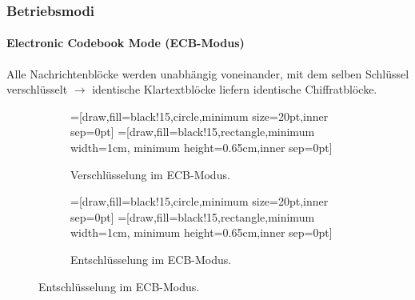 \subsubsection{Betriebsmodi}

\paragraph{Electronic Codebook Mode (ECB-Modus)}
Alle Nachrichtenblöcke werden unabhängig voneinander, mit dem selben Schlüssel verschlüsselt \(\rightarrow\) identische Klartextblöcke liefern identische Chiffratblöcke.

\begin{figure}[h]
	\centering
	\begin{subfigure}[h]{.45\textwidth}
		\centering
		=[draw,fill=black!15,circle,minimum size=20pt,inner sep=0pt]
		=[draw,fill=black!15,rectangle,minimum width=1cm, minimum height=0.65cm,inner sep=0pt]
		\caption{Verschlüsselung im ECB-Modus.}
	\end{subfigure}
	\hfill
	\begin{subfigure}[h]{.45\textwidth}
		\centering
		=[draw,fill=black!15,circle,minimum size=20pt,inner sep=0pt]
		=[draw,fill=black!15,rectangle,minimum width=1cm, minimum height=0.65cm,inner sep=0pt]
		\caption{Entschlüsselung im ECB-Modus.}
	\end{subfigure}
\end{figure}
\FloatBarrier

